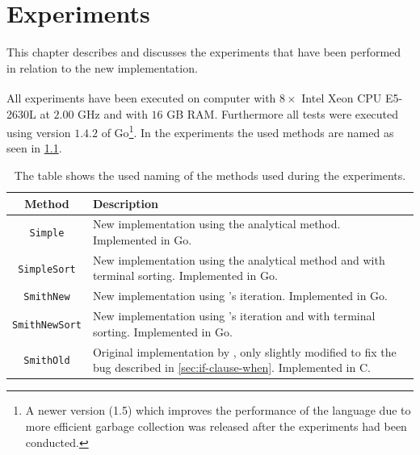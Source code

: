 {
\abnormalparskip{0pt}
\chapter{Experiments}
\label{cha:experiments}
}

This chapter describes and discusses the experiments that have been performed in
relation to the new implementation.

All experiments have been executed on computer with $8 \times$
Intel\textsuperscript{\textregistered} Xeon\textsuperscript{\textregistered} CPU
E5-2630L at $2.00$ GHz and with $16$ GB RAM. Furthermore all tests were executed
using version $1.4.2$ of Go\footnote{A newer version (1.5) which improves the performance of
  the language due to more efficient garbage collection was released after the
  experiments had been conducted.}. In the experiments the used methods are
named as seen in \cref{tab:method-names}.

\begin{table}[htbp]
  \centering
  \begin{tabular}{cp{9cm}}
    \toprule
    Method                & Description                                                                                                                                      \\
    \midrule
    \texttt{Simple}       & New implementation using the analytical method. Implemented in Go.                                                                               \\
    \texttt{SimpleSort}   & New implementation using the analytical method and with terminal sorting. Implemented in Go.                                                     \\
    \texttt{SmithNew}     & New implementation using \citeauthor{smith1992}'s iteration. Implemented in Go.                                                                  \\
    \texttt{SmithNewSort} & New implementation using \citeauthor{smith1992}'s iteration and with terminal sorting. Implemented in Go.                                        \\
    \texttt{SmithOld}     & Original implementation by \textcite{smith1992}, only slightly modified to fix the bug described in \cref{sec:if-clause-when}. Implemented in C. \\
    \bottomrule
  \end{tabular}
  \caption[Naming of methods]{The table shows the used naming of the methods
    used during the experiments.\label{tab:method-names}}
\end{table}

